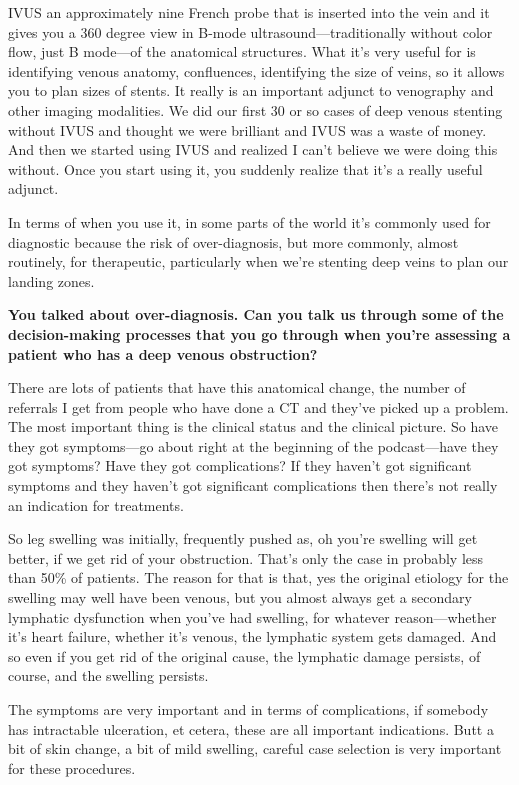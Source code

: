 \documentclass[
]{book}
\begin{document}
IVUS an approximately nine French probe that is inserted into the vein
and it gives you a 360 degree view in B-mode ultrasound---traditionally
without color flow, just B mode---of the anatomical structures. What
it's very useful for is identifying venous anatomy, confluences,
identifying the size of veins, so it allows you to plan sizes of stents.
It really is an important adjunct to venography and other imaging
modalities. We did our first 30 or so cases of deep venous stenting
without IVUS and thought we were brilliant and IVUS was a waste of
money. And then we started using IVUS and realized I can't believe we
were doing this without. Once you start using it, you suddenly realize
that it's a really useful adjunct.

In terms of when you use it, in some parts of the world it's commonly
used for diagnostic because the risk of over-diagnosis, but more
commonly, almost routinely, for therapeutic, particularly when we're
stenting deep veins to plan our landing zones.

\textbf{You talked about over-diagnosis. Can you talk us through some of the
decision-making processes that you go through when you're assessing a
patient who has a deep venous obstruction?}

There are lots of patients that have this anatomical change, the number
of referrals I get from people who have done a CT and they've picked up
a problem. The most important thing is the clinical status and the
clinical picture. So have they got symptoms---go about right at the
beginning of the podcast---have they got symptoms? Have they got
complications? If they haven't got significant symptoms and they haven't
got significant complications then there's not really an indication for
treatments.

So leg swelling was initially, frequently pushed as, oh you're swelling
will get better, if we get rid of your obstruction. That's only the case
in probably less than 50\% of patients. The reason for that is that, yes
the original etiology for the swelling may well have been venous, but
you almost always get a secondary lymphatic dysfunction when you've had
swelling, for whatever reason---whether it's heart failure, whether it's
venous, the lymphatic system gets damaged. And so even if you get rid of
the original cause, the lymphatic damage persists, of course, and the
swelling persists.

The symptoms are very important and in terms of complications, if
somebody has intractable ulceration, et cetera, these are all important
indications. Butt a bit of skin change, a bit of mild swelling, careful
case selection is very important for these procedures.
\end{document}
